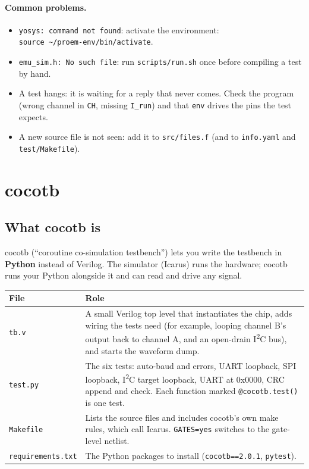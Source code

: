 \documentclass[11pt,a4paper]{article}
\newcommand{\file}[1]{\texttt{#1}}
\begin{document}
\paragraph{Common problems.}
\begin{itemize}
\item \texttt{yosys: command not found}: activate the environment:\\ \texttt{source \textasciitilde/proem-env/bin/activate}.
\item \texttt{emu\_sim.h: No such file}: run \file{scripts/run.sh} once before compiling a test by hand.
\item A test hangs: it is waiting for a reply that never comes. Check the program (wrong channel in \texttt{CH}, missing \texttt{I\_run}) and that \texttt{env} drives the pins the test expects.
\item A new source file is not seen: add it to \file{src/files.f} (and to \file{info.yaml} and \file{test/Makefile}).
\end{itemize}

\section{cocotb}\label{sec:cocotb}

\subsection{What cocotb is}

cocotb (``coroutine co-simulation testbench'') lets you write the testbench in \textbf{Python} instead of Verilog. The simulator (Icarus) runs the hardware; cocotb runs your Python alongside it and can read and drive any signal.

\begin{center}
\begin{tabularx}{\linewidth}{@{}lL@{}}
\toprule
File & Role \\
\midrule
\file{tb.v} & A small Verilog top level that instantiates the chip, adds wiring the tests need (for example, looping channel B's output back to channel A, and an open-drain I\textsuperscript{2}C bus), and starts the waveform dump. \\
\file{test.py} & The six tests: auto-baud and errors, UART loopback, SPI loopback, I\textsuperscript{2}C target loopback, UART at 0x0000, CRC append and check. Each function marked \texttt{@cocotb.test()} is one test. \\
\file{Makefile} & Lists the source files and includes cocotb's own make rules, which call Icarus. \texttt{GATES=yes} switches to the gate-level netlist. \\
\file{requirements.txt} & The Python packages to install (\texttt{cocotb==2.0.1}, \texttt{pytest}). \\
\bottomrule
\end{tabularx}
\end{center}
\end{document}
